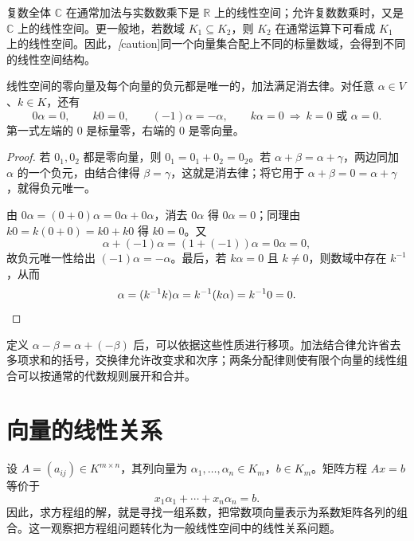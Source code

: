 \begin{example}
\label{ex:complex-as-real-space}
复数全体 $\mathbb C$ 在通常加法与实数数乘下是 $\mathbb R$ 上的线性空间；允许复数数乘时，又是 $\mathbb C$ 上的线性空间。更一般地，若数域 $K_1\subseteq K_2$，则 $K_2$ 在通常运算下可看成 $K_1$ 上的线性空间。因此，\emph[caution]{同一个向量集合配上不同的标量数域，会得到不同的线性空间结构}。
\end{example}

\begin{proposition}
\label{prop:vector-space-basic-identities}
线性空间的零向量及每个向量的负元都是唯一的，加法满足消去律。对任意 $\alpha\in V$、$k\in K$，还有
\[
    0\alpha=0,\qquad k0=0,\qquad (-1)\alpha=-\alpha,
    \qquad k\alpha=0\ \Longrightarrow\ k=0\text{ 或 }\alpha=0.
\]
第一式左端的 $0$ 是标量零，右端的 $0$ 是零向量。
\end{proposition}

\begin{proof}
若 $0_1,0_2$ 都是零向量，则 $0_1=0_1+0_2=0_2$。若 $\alpha+\beta=\alpha+\gamma$，两边同加 $\alpha$ 的一个负元，由结合律得 $\beta=\gamma$，这就是消去律；将它用于 $\alpha+\beta=0=\alpha+\gamma$，就得负元唯一。

由 $0\alpha=(0+0)\alpha=0\alpha+0\alpha$，消去 $0\alpha$ 得 $0\alpha=0$；同理由 $k0=k(0+0)=k0+k0$ 得 $k0=0$。又
\[
    \alpha+(-1)\alpha=(1+(-1))\alpha=0\alpha=0,
\]
故负元唯一性给出 $(-1)\alpha=-\alpha$。最后，若 $k\alpha=0$ 且 $k\ne0$，则数域中存在 $k^{-1}$，从而
\[
    \alpha=(k^{-1}k)\alpha=k^{-1}(k\alpha)=k^{-1}0=0.\qedhere
\]
\end{proof}

定义 $\alpha-\beta=\alpha+(-\beta)$ 后，可以依据这些性质进行移项。加法结合律允许省去多项求和的括号，交换律允许改变求和次序；两条分配律则使有限个向量的线性组合可以按通常的代数规则展开和合并。

\section{向量的线性关系}
\label{sec:linear-relations}

设 $A=(a_{ij})\in K^{m\times n}$，其列向量为 $\alpha_1,\ldots,\alpha_n\in K_m$，$b\in K_m$。矩阵方程 $Ax=b$ 等价于
\begin{equation}
\label{eq:linear-system-column-combination}
    x_1\alpha_1+\cdots+x_n\alpha_n=b.
\end{equation}
因此，求方程组的解，就是寻找一组系数，把常数项向量表示为系数矩阵各列的组合。这一观察把方程组问题转化为一般线性空间中的线性关系问题。

